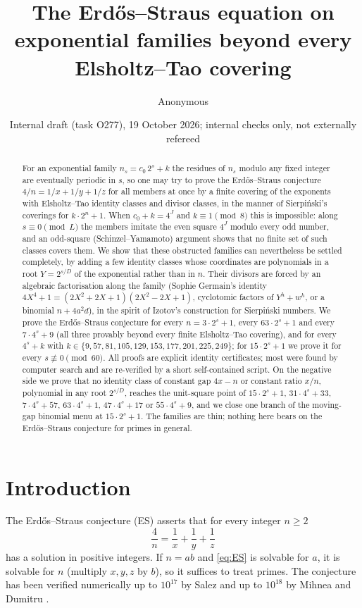 \documentclass[11pt,reqno]{amsart}
\title[Erd\H{o}s--Straus for exponential families]{The Erd\H{o}s--Straus equation on exponential families beyond every Elsholtz--Tao covering}
\author{Anonymous}
\date{Internal draft (task O277), 19 October 2026; internal checks only, not externally refereed}
\theoremstyle{definition}
\begin{document}
\begin{abstract}
For an exponential family $n_s=c_0\,2^s+k$ the residues of $n_s$ modulo any
fixed integer are eventually periodic in $s$, so one may try to prove the
Erd\H{o}s--Straus conjecture $4/n=1/x+1/y+1/z$ for all members at once by a
finite covering of the exponents with Elsholtz--Tao identity classes and
divisor classes, in the manner of Sierpi\'nski's coverings for $k\cdot2^n+1$.
When $c_0+k=4^J$ and $k\equiv1\pmod 8$ this is impossible: along
$s\equiv0\pmod L$ the members imitate the even square $4^J$ modulo every
odd number, and an odd-square (Schinzel--Yamamoto) argument shows that no
finite set of such classes covers them.  We show that these
obstructed families can nevertheless be settled completely, by adding a few
identity classes whose coordinates are polynomials in a root $Y=2^{s/D}$ of
the exponential rather than in $n$.  Their divisors are forced by an
algebraic factorisation along the family (Sophie Germain's identity
$4X^4+1=(2X^2+2X+1)(2X^2-2X+1)$, cyclotomic factors of $Y^h+w^h$, or a
binomial $n+4a^2d$), in the spirit of Izotov's construction for Sierpi\'nski
numbers.  We prove the Erd\H{o}s--Straus conjecture for every
$n=3\cdot2^s+1$, every $63\cdot2^s+1$ and every $7\cdot4^s+9$ (all three
provably beyond every finite Elsholtz--Tao covering), and for every
$4^s+k$ with $k\in\{9,57,81,105,129,153,177,201,225,249\}$; for
$15\cdot2^s+1$ we prove it for every $s\not\equiv0\pmod{60}$.  All proofs
are explicit identity certificates; most were found by computer search and
are re-verified by a short self-contained script.  On the negative side we
prove that no identity class of constant gap $4x-n$ or constant ratio $x/n$,
polynomial in any root $2^{s/D}$, reaches the unit-square point of
$15\cdot2^s+1$, $31\cdot4^s+33$, $7\cdot4^s+57$, $63\cdot4^s+1$,
$47\cdot4^s+17$ or $55\cdot4^s+9$, and we close one branch of the
moving-gap binomial menu at $15\cdot2^s+1$.  The families are thin; nothing
here bears on the Erd\H{o}s--Straus conjecture for primes in general.
\end{abstract}
\maketitle
\tableofcontents

\section{Introduction}\label{sec:intro}

The Erd\H{o}s--Straus conjecture (ES) asserts that for every integer $n\ge2$
\begin{equation}\label{eq:ES}
 \frac4n=\frac1x+\frac1y+\frac1z
\end{equation}
has a solution in positive integers.  If $n=ab$ and \eqref{eq:ES} is
solvable for $a$, it is solvable for $n$ (multiply $x,y,z$ by $b$), so it
suffices to treat primes.  The conjecture has been verified numerically
up to $10^{17}$ by Salez \cite{Salez} and up to $10^{18}$ by Mihnea and
Dumitru \cite{MD}.
\end{document}
